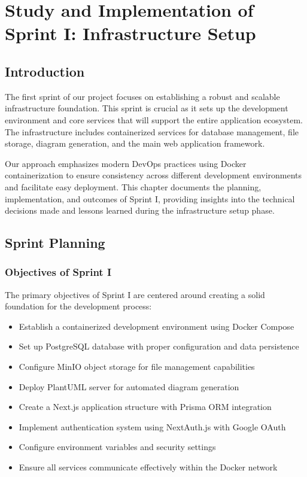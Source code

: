 \chapter[Sprint I]{Study and Implementation of Sprint I: Infrastructure Setup}


\section{Introduction}

The first sprint of our project focuses on establishing a robust and scalable infrastructure foundation. This sprint is crucial as it sets up the development environment and core services that will support the entire application ecosystem. The infrastructure includes containerized services for database management, file storage, diagram generation, and the main web application framework.

Our approach emphasizes modern DevOps practices using Docker containerization to ensure consistency across different development environments and facilitate easy deployment. This chapter documents the planning, implementation, and outcomes of Sprint I, providing insights into the technical decisions made and lessons learned during the infrastructure setup phase.

\section{Sprint Planning}

\subsection{Objectives of Sprint I}

The primary objectives of Sprint I are centered around creating a solid foundation for the development process:

\begin{itemize}
    \item Establish a containerized development environment using Docker Compose
    \item Set up PostgreSQL database with proper configuration and data persistence
    \item Configure MinIO object storage for file management capabilities
    \item Deploy PlantUML server for automated diagram generation
    \item Create a Next.js application structure with Prisma ORM integration
    \item Implement authentication system using NextAuth.js with Google OAuth
    \item Configure environment variables and security settings
    \item Ensure all services communicate effectively within the Docker network
\end{itemize}

